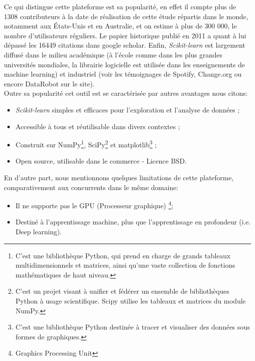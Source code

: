 Ce qui distingue cette plateforme est sa popularité, en effet il compte plus de 1308 contributeurs à la date de réalisation de cette étude répartis dans le monde, notamment aux États-Unis et en Australie, et on estime à plus de 300 000, le nombre d’utilisateurs réguliers. Le papier historique publié en 2011 a quant à lui dépassé les 16449 citations dans google scholar. Enfin, \textit{Scikit-learn} est largement diffusé dans le milieu académique (à l’école comme dans les plus grandes universités mondiales, la librairie logicielle est utilisée dans les enseignements de machine learning) et industriel (voir les témoignages de Spotify, Change.org ou encore DataRobot sur le site).\\

Outre sa popularité cet outil est se caractérisée par autres avantages nous citons:
\begin{itemize}
\item[\textbullet] \textit{Scikit-learn} simples et efficaces pour l'exploration et l'analyse de données ;
\item[\textbullet] Accessible à tous et réutilisable dans divers contextes ;
\item[\textbullet] Construit sur NumPy\footnote{C'est une bibliothèque Python, qui prend en charge de grands tableaux multidimensionnels et matrices, ainsi qu’une vaste collection de fonctions mathématiques de haut niveau.}, SciPy\footnote{C'est un projet visant à unifier et fédérer un ensemble de bibliothèques Python à usage scientifique. Scipy utilise les tableaux et matrices du module NumPy.} et matplotlib\footnote{C'est une bibliothèque Python destinée à tracer et visualiser des données sous formes de graphiques.} ;
\item[\textbullet] Open source, utilisable dans le commerce - Licence BSD.\\
\end{itemize}

En d'autre part, nous mentionnons quelques limitations de cette plateforme, comparativement aux concurrents dans le même domaine:
\begin{itemize}
\item[\textbullet] Il ne supporte pas le GPU (Processeur graphique) \footnote{Graphics Processing Unit};
\item[\textbullet] Destiné à l'apprentissage machine, plus que l'apprentissage en profondeur (i.e. Deep learning).
\end{itemize}


